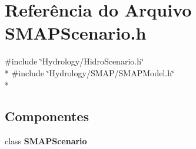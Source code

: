 \section{Referência do Arquivo S\+M\+A\+P\+Scenario.\+h}
\label{_s_m_a_p_scenario_8h}
{\ttfamily \#include \char`\"{}Hydrology/\+Hidro\+Scenario.\+h\char`\"{}}\\*
{\ttfamily \#include \char`\"{}Hydrology/\+S\+M\+A\+P/\+S\+M\+A\+P\+Model.\+h\char`\"{}}\\*
\subsection*{Componentes}
\begin{DoxyCompactItemize}
\item 
class {\bf S\+M\+A\+P\+Scenario}
\end{DoxyCompactItemize}
